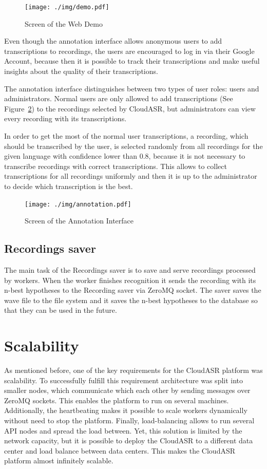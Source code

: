 \begin{figure}[h]
  \centering
  \texttt{[image: ./img/demo.pdf]}

  \caption{Screen of the Web Demo}
  \label{fig:webdemo}
\end{figure}

Even though the annotation interface allows anonymous users to add transcriptions to recordings,
  the users are encouraged to log in via their Google Account,
  because then it is possible to track their transcriptions
    and make useful insights about the quality of their transcriptions.

The annotation interface distinguishes between two types of user roles: users and administrators.
Normal users are only allowed to add transcriptions (See Figure~\ref{fig:annotation-interface}) to the recordings selected by CloudASR,
  but administrators can view every recording with its transcriptions.

In order to get the most of the normal user transcriptions,
  a recording, which should be transcribed by the user,
  is selected randomly from all recordings for the given language with confidence lower than 0.8,
    because it is not necessary to transcribe recordings with correct transcriptions.
This allows to collect transcriptions for all recordings uniformly
  and then it is up to the administrator to decide which transcription is the best.

\begin{figure}[h]
  \centering
  \texttt{[image: ./img/annotation.pdf]}

  \caption{Screen of the Annotation Interface}
  \label{fig:annotation-interface}
\end{figure}



\subsection{Recordings saver}
The main task of the Recordings saver is to save and serve recordings processed by workers.
When the worker finishes recognition
  it sends the recording with its n-best hypotheses to the Recording saver via ZeroMQ socket.
The saver saves the wave file to the file system
  and it saves the n-best hypotheses to the database so that they can be used in the future.


\section{Scalability}
As mentioned before, one of the key requirements for the CloudASR platform was scalability.
To successfully fulfill this requirement architecture was split into smaller nodes,
  which communicate which each other by sending messages over ZeroMQ sockets.
This enables the platform to run on several machines.
Additionally, the heartbeating makes it possible to scale workers dynamically without need to stop the platform.
Finally, load-balancing allows to run several API nodes and spread the load between.
Yet, this solution is limited by the network capacity,
  but it is possible to deploy the CloudASR to a different data center
  and load balance between data centers.
This makes the CloudASR platform almost infinitely scalable.


